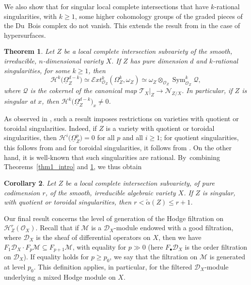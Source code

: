 \documentclass[JEP,XML,SOM,Unicode]{cedram}
\newcommand{\sbullet}{{\scriptscriptstyle\bullet}}
\newcommand{\DXmodule}{$\cD_X$\nobreakdash-mod\-ule\xspace}
\theoremstyle{plain}
\newtheorem{thm}{Theorem}[section]
\newtheorem{cor}[thm]{Corollary}
\theoremstyle{definition}
\newcommand\cD{\mathcal{D}}
\newcommand\cH{\mathcal{H}}
\newcommand\cO{\mathcal{O}}
\newcommand\cM{\mathcal{M}}
\newcommand\cH{\mathcal{H}}
\newcommand\cO{\mathcal{O}}
\DeclareMathOperator{\Sym}{Sym}
\begin{document}
We also show that for singular local complete intersections that have $k$-rational singularities, with $k\geq 1$, some higher cohomology groups of the graded
pieces of the Du~Bois complex do not vanish. This extends the result from \cite[Th.\,1.5]{MOPW} in the case of hypersurfaces.

\begin{thm}\label{thm_nonvanishing}
Let $Z$ be a local complete intersection subvariety of the smooth, irreducible, $n$-dimensional variety $X$. If $Z$ has pure dimension $d$ and $k$-rational singularities, for some $k\geq 1$,
then
\[
\cH^k\big(\underline\Omega^{d-k}_Z\big) \simeq \mathcal{E}{xt}^k_{\cO_Z}(\Omega_Z^k,\omega_Z) \simeq \omega_Z \otimes_{\cO_Z} \Sym^k_{\mathcal O_Z} \mathcal Q,
\]
where $\mathcal Q$ is the cokernel of the canonical map $\mathcal T_X|_Z \to \mathcal N_{Z/X}$. In particular, if $Z$ is singular at $x$, then
$\cH^k\big(\underline\Omega^{d-k}_Z\big)_x\neq 0$.
\end{thm}

As observed in \cite{MOPW}, such a result imposes restrictions on varieties with quotient or toroidal singularities.
Indeed, if $Z$ is a variety with quotient or toroidal singularities, then $\cH^i\big(\underline{\Omega}_Z^p)=0$ for all $p$ and all $i\geq 1$;
for quotient singularities, this follows from \cite[\S 5]{DuBois} and for toroidal singularities, it follows from \cite[Ch.\,V.4]{GNPP}.
On the other hand, it is well-known that such singularities are rational. By~combining Theorems~\ref{thm1_intro} and \ref{thm_nonvanishing},
we thus obtain

\begin{cor}
Let $Z$ be a local complete intersection subvariety, of pure codimension $r$, of the smooth, irreducible algebraic variety $X$. If $Z$ is singular,
with quotient or toroidal singularities, then $r<\widetilde{\alpha}(Z)\leq r+1$.
\end{cor}

Our final result concerns the level of generation of the Hodge filtration on
$\cH^r_Z(\cO_X)$. Recall that if $\cM$ is a \DXmodule endowed with a good filtration, where $\cD_X$ is the sheaf of differential operators on $X$, then we have
$F_1\cD_X\cdot F_p\cM\subseteq F_{p+1}\cM$, with equality for $p\gg 0$ (here $F_{\sbullet}\cD_X$ is the order filtration on $\cD_X$). If equality
holds for $p\geq p_0$, we say that the filtration on $\cM$ is generated at level $p_0$. This definition applies, in particular, for the filtered \DXmodule
underlying a mixed Hodge module on $X$.
\end{document}
